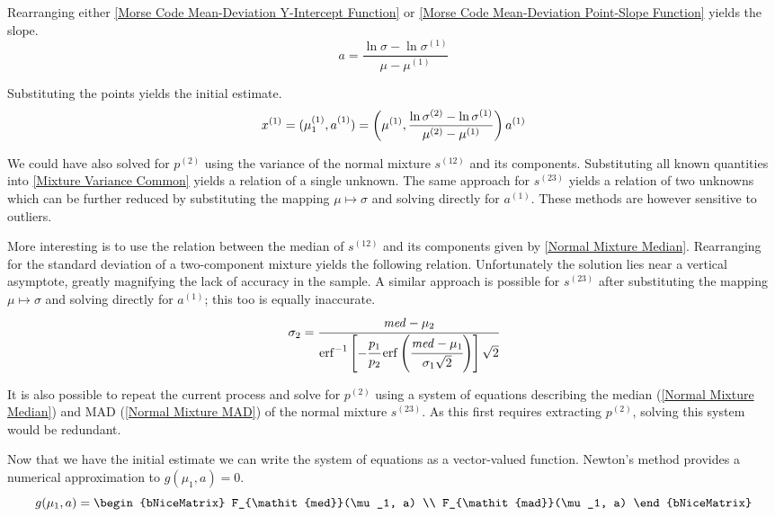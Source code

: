 \documentclass{article}
\newcommand{\mli}[1]{\mathit{#1}}
\DeclareMathOperator\erf{erf}
\begin{document}
Rearranging either \ref{Morse Code Mean-Deviation Y-Intercept Function} or \ref{Morse Code Mean-Deviation Point-Slope Function} yields the slope.
%
\begin{equation}
a = \frac{\ln\sigma - \ln\sigma^{(1)}}{\mu - \mu^{(1)}}
\end{equation}

Substituting the points yields the initial estimate.
%
\begin{equation}\label{Morse Code Sample Estimate}
x^{(1)} = (\mu^{(1)}_1, a^{(1)}_{\vphantom{1}}) = \left(
    \mu^{(1)},
    \frac{\ln\sigma^{(2)} - \ln\sigma^{(1)}}{\mu^{(2)} - \mu^{(1)}}
\right)a^{(1)}
\end{equation}

We could have also solved for $p^{(2)}$ using the variance of the normal mixture $s^{(12)}$ and its components. Substituting all known quantities into \ref{Mixture Variance Common} yields a relation of a single unknown. The same approach for $s^{(23)}$ yields a relation of two unknowns which can be further reduced by substituting the mapping $\mu \mapsto \sigma$ and solving directly for $a^{(1)}$. These methods are however sensitive to outliers.

More interesting is to use the relation between the median of $s^{(12)}$ and its components given by \ref{Normal Mixture Median}. Rearranging for the standard deviation of a two-component mixture yields the following relation. Unfortunately the solution lies near a vertical asymptote, greatly magnifying the lack of accuracy in the sample. A similar approach is possible for $s^{(23)}$ after substituting the mapping $\mu \mapsto \sigma$ and solving directly for $a^{(1)}$; this too is equally inaccurate.
%
\begin{equation}\label{2nd Standard Deviation of Two-Component Normal Mixture}
\sigma_2 = \cfrac
    {\mli{med} - \mu_2}
    {\erf^{-1} \left[
        -\cfrac{p_1}{p_2} \erf \left(
            \cfrac{\mli{med} - \mu_1}{\sigma_1\sqrt{2}}
        \right)
    \right] \sqrt{2}}
\end{equation}

It is also possible to repeat the current process and solve for $p^{(2)}$ using a system of equations describing the median (\ref{Normal Mixture Median}) and MAD (\ref{Normal Mixture MAD}) of the normal mixture $s^{(23)}$. As this first requires extracting $p^{(2)}$, solving this system would be redundant.

Now that we have the initial estimate we can write the system of equations as a vector-valued function. Newton's method provides a numerical approximation to $g(\mu_1, a) = 0$.
%
\begin{equation}\label{Morse Code Mixture Vector Function}
g(\mu_1, a) = \begin{bNiceMatrix}
F_{\mli{med}}(\mu_1, a) \\
F_{\mli{mad}}(\mu_1, a)
\end{bNiceMatrix}
\end{equation}
\end{document}
